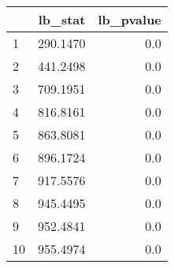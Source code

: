\begin{tabular}{lrr}
\toprule
{} &   lb\_stat &  lb\_pvalue \\
\midrule
1  &  290.1470 &        0.0 \\
2  &  441.2498 &        0.0 \\
3  &  709.1951 &        0.0 \\
4  &  816.8161 &        0.0 \\
5  &  863.8081 &        0.0 \\
6  &  896.1724 &        0.0 \\
7  &  917.5576 &        0.0 \\
8  &  945.4495 &        0.0 \\
9  &  952.4841 &        0.0 \\
10 &  955.4974 &        0.0 \\
\bottomrule
\end{tabular}
